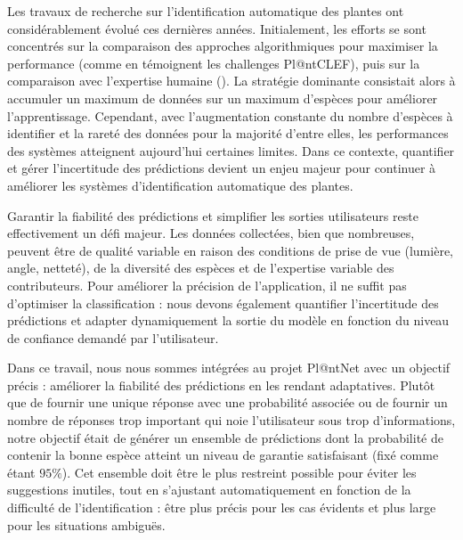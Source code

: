 \documentclass[a4paper,12pt]{article}
\begin{document}
\vspace{0.2cm}

Les travaux de recherche sur l'identification automatique des plantes ont considérablement évolué ces dernières années. Initialement, les efforts se sont concentrés sur la comparaison des approches algorithmiques pour maximiser la performance (comme en témoignent les challenges Pl@ntCLEF), puis sur la comparaison avec l'expertise humaine (\cite{Bonnet}). La stratégie dominante consistait alors à accumuler un maximum de données sur un maximum d'espèces pour améliorer l'apprentissage. Cependant, avec l'augmentation constante du nombre d'espèces à identifier et la rareté des données pour la majorité d'entre elles, les performances des systèmes atteignent aujourd'hui certaines limites. Dans ce contexte, quantifier et gérer l'incertitude des prédictions devient un enjeu majeur pour continuer à améliorer les systèmes d'identification automatique des plantes.

\vspace{0.2cm}

Garantir la fiabilité des prédictions et simplifier les sorties utilisateurs reste effectivement un défi majeur. Les données collectées, bien que nombreuses, peuvent être de qualité variable en raison des conditions de prise de vue (lumière, angle, netteté), de la diversité des espèces et de l'expertise variable des contributeurs. Pour améliorer la précision de l'application, il ne suffit pas d’optimiser la classification : nous devons également quantifier l’incertitude des prédictions et adapter dynamiquement la sortie du modèle en fonction du niveau de confiance demandé par l'utilisateur.

\vspace{0.2cm}

Dans ce travail, nous nous sommes intégrées au projet Pl@ntNet avec un objectif précis : améliorer la fiabilité des prédictions en les rendant adaptatives. Plutôt que de fournir une unique réponse avec une probabilité associée ou de fournir un nombre de réponses trop important qui noie l'utilisateur sous trop d'informations, notre objectif était de générer un ensemble de prédictions dont la probabilité de contenir la bonne espèce atteint un niveau de garantie satisfaisant (fixé comme étant $95\%$). Cet ensemble doit être le plus restreint possible pour éviter les suggestions inutiles, tout en s'ajustant automatiquement en fonction de la difficulté de l’identification : être plus précis pour les cas évidents et plus large pour les situations ambiguës.
\end{document}
